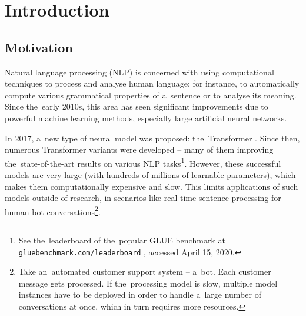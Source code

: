 \documentclass[bsc,frontabs,singlespacing,parskip,deptreport]{infthesis}
\newcommand\rurl[1]{%
  \href{https://#1}{\nolinkurl{#1}}%
}
\begin{document}
\chapter{Introduction}{
  \setcounter{page}{1}
  \section{Motivation}{
    Natural language processing (NLP) is concerned with using computational techniques to process and analyse human language: for instance, to automatically compute various grammatical properties of a~sentence or to analyse its meaning.
    Since the~early 2010s, this area has seen significant improvements due to powerful machine learning methods, especially large artificial neural networks.

    In 2017, a~new type of neural model was proposed: the~Transformer \citep{Vaswani_2017}. Since then, numerous Transformer variants were developed \citep{Radford_2018,Devlin_2018,Lan_2019,Liu_2019,Lample_2019} -- many of them improving the~state-of-the-art results on various NLP tasks\footnote{See the~leaderboard of the~popular GLUE benchmark \citep{Wang_2018} at \rurl{gluebenchmark.com/leaderboard}, accessed April 15, 2020.}.
    However, these successful models are very large (with hundreds of millions of learnable parameters), which makes them computationally expensive and slow. This limits applications of such models outside of research, in scenarios like real-time sentence processing for human-bot conversations\footnote{Take an~automated customer support system -- a~bot. Each customer message gets processed. If the~processing model is slow, multiple model instances have to be deployed in order to handle a~large number of conversations at once, which in turn requires more resources.}.

}}
\end{document}
